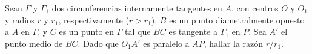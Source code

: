 Sean $\Gamma$ y $\Gamma_1$ dos circunferencias internamente tangentes en $A$, con centros $O$ y $O_1$ y radios $r$ y $r_1$, respectivamente ($r>r_1$). $B$ es un punto diametralmente opuesto a $A$ en $\Gamma$, y $C$ es un punto en $\Gamma$ tal que $BC$ es tangente a $\Gamma_1$ en $P$. Sea $A'$ el punto medio de $BC$. Dado que $O_1A'$ es paralelo a $AP$, hallar la razón $r/r_1$.
